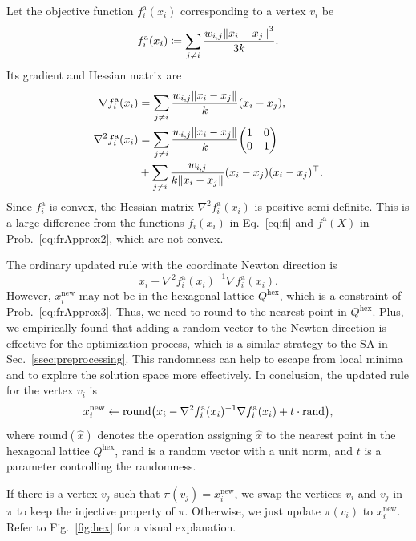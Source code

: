 \documentclass[dvipdfmx,10pt,journal,compsoc]{IEEEtran}
\newcommand{\defeq}{\coloneqq}
\begin{document}
Let the objective function $f^{\mathrm{a}}_i(x_i)$ corresponding to a vertex $v_i$ be
\begin{equation*}
  f^{\mathrm{a}}_i(x_i) \defeq \sum_{j \neq i} \frac{w_{i,j}\norm{x_i - x_j}^3}{3k}.
\end{equation*}
Its gradient and Hessian matrix are
\begin{align*}
  \nabla f^{\mathrm{a}}_i(x_i)   & = \sum_{j \neq i} \frac{w_{i,j}\norm{x_i - x_j}}{k} (x_i - x_j),                     \\
  \nabla^2 f^{\mathrm{a}}_i(x_i) & = \sum_{j \neq i} \frac{w_{i,j}\norm{x_i - x_j}}{k} \mqty(1                      & 0 \\0&1) \\
                                 & + \sum_{j \neq i} \frac{w_{i,j}}{k\norm{x_i - x_j}} (x_i - x_j)(x_i - x_j)^\top.
\end{align*}
Since $f^{\mathrm{a}}_i$ is convex, the Hessian matrix $\nabla^2 f^{\mathrm{a}}_i(x_i)$ is positive semi-definite. This is a large difference from the functions $f_i(x_i)$ in Eq.~\eqref{eq:fi} and $f^{\mathrm{a}}(X)$ in Prob.~\eqref{eq:frApprox2}, which are not convex.

The ordinary updated rule with the coordinate Newton direction is
\begin{equation*}
  x_i - \nabla^2 f^{\mathrm{a}}_i(x_i)^{-1} \nabla f^{\mathrm{a}}_i(x_i).
\end{equation*}
However, $x_i^\mathrm{new}$ may not be in the hexagonal lattice $Q^\mathrm{hex}$, which is a constraint of Prob.~\eqref{eq:frApprox3}.
Thus, we need to round to the nearest point in $Q^\mathrm{hex}$. Plus, we empirically found that adding a random vector to the Newton direction is effective for the optimization process, which is a similar strategy to the SA in Sec.~\ref{ssec:preprocessing}. This randomness can help to escape from local minima and to explore the solution space more effectively.
In conclusion, the updated rule for the vertex $v_i$ is
\begin{equation*}
  x_i^\mathrm{new} \gets \mathrm{round}\qty(x_i - \nabla^2 f^{\mathrm{a}}_i(x_i)^{-1} \nabla f^{\mathrm{a}}_i(x_i) + t \cdot \text{rand}),
\end{equation*}
where $\mathrm{round}(\hat{x})$ denotes the operation assigning $\hat{x}$ to the nearest point in the hexagonal lattice $Q^\mathrm{hex}$, $\mathrm{rand}$ is a random vector with a unit norm, and $t$ is a parameter controlling the randomness.

If there is a vertex $v_j$ such that $\pi(v_j) = x_i^\mathrm{new}$, we swap the vertices $v_i$ and $v_j$ in $\pi$ to keep the injective property of $\pi$. Otherwise, we just update $\pi(v_i)$ to $x_i^\mathrm{new}$. Refer to Fig.~\ref{fig:hex} for a visual explanation.
\end{document}
